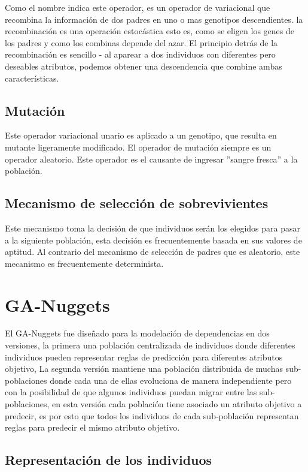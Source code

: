 Como el nombre indica este operador, es un operador de variacional que recombina la información de dos padres en uno o mas genotipos descendientes. la recombinación es una operación estocástica esto es, como se eligen los genes de los padres y como los combinas depende del azar. El principio detrás de la recombinación es sencillo - al aparear a dos individuos con diferentes pero deseables atributos, podemos obtener una descendencia que combine ambas características. 

\subsection{Mutación}

Este operador variacional unario es aplicado a un genotipo, que resulta en mutante ligeramente modificado. El operador de mutación siempre es un operador aleatorio. Este operador es el causante de ingresar ''sangre fresca''  a la población.

\subsection{Mecanismo de selección de sobrevivientes}

Este mecanismo toma la decisión de que individuos serán los elegidos para pasar a la siguiente población, esta decisión es frecuentemente basada en sus valores de aptitud. Al contrario del mecanismo de selección de padres que es aleatorio, este mecanismo es frecuentemente determinista. 

\section{GA-Nuggets}

El GA-Nuggets fue diseñado para la modelación de dependencias en dos versiones, la primera una población centralizada de individuos donde diferentes individuos pueden representar reglas de predicción para diferentes atributos objetivo, La segunda versión mantiene una población distribuida de muchas sub-poblaciones donde cada una de ellas evoluciona de manera independiente pero con la posibilidad de que algunos individuos puedan migrar entre las sub-poblaciones, en esta versión cada población tiene asociado un atributo objetivo a predecir, es por esto que todos los individuos de cada sub-población representan reglas para predecir el mismo atributo objetivo.

\subsection{Representación de los individuos}

